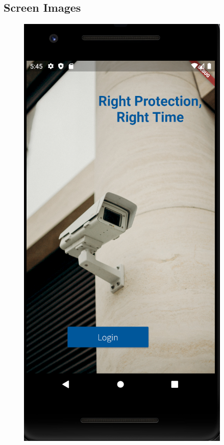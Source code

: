 \documentclass[12pt]{article}
\begin{document}
\subsection {Screen Images}
\FloatBarrier
\begin{figure}[h]
  \centering
  \begin{minipage}[b]{0.32\textwidth}
    \includegraphics[width=\textwidth]{HomePage.PNG}

\end{minipage}
\end{figure}
\end{document}
